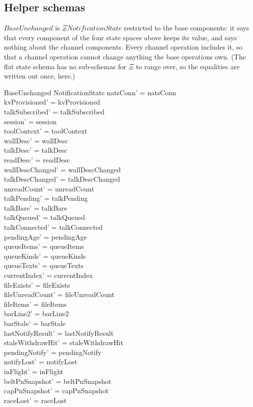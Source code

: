 \documentclass[a4paper,10pt,fleqn]{article}
\begin{document}
\subsection{Helper schemas}
\label{sec:chanhelpers}

$BaseUnchanged$ is $\Xi NotificationState$ restricted to the base
components: it says that every component of the four state spaces above
keeps its value, and says nothing about the channel components.  Every
channel operation includes it, so that a channel operation cannot change
anything the base operations own.  (The flat state schema has no sub-schemas
for $\Xi$ to range over, so the equalities are written out once, here.)

\begin{schema}{BaseUnchanged}
  \Delta NotificationState
  \where
  natsConn' = natsConn \\
  kvProvisioned' = kvProvisioned \\
  talkSubscribed' = talkSubscribed \\
  session' = session \\
  toolContext' = toolContext \\
  wallDesc' = wallDesc \\
  talkDesc' = talkDesc \\
  readDesc' = readDesc \\
  wallDescChanged' = wallDescChanged \\
  talkDescChanged' = talkDescChanged \\
  unreadCount' = unreadCount \\
  talkPending' = talkPending \\
  talkBare' = talkBare \\
  talkQueued' = talkQueued \\
  talkConnected' = talkConnected \\
  pendingAge' = pendingAge \\
  queueItems' = queueItems \\
  queueKinds' = queueKinds \\
  queueTexts' = queueTexts \\
  currentIndex' = currentIndex \\
  fileExists' = fileExists \\
  fileUnreadCount' = fileUnreadCount \\
  fileItems' = fileItems \\
  barLine2' = barLine2 \\
  barStale' = barStale \\
  lastNotifyResult' = lastNotifyResult \\
  staleWithdrawHit' = staleWithdrawHit \\
  pendingNotify' = pendingNotify \\
  notifyLost' = notifyLost \\
  inFlight' = inFlight \\
  beltPnSnapshot' = beltPnSnapshot \\
  capPnSnapshot' = capPnSnapshot \\
  raceLost' = raceLost
\end{schema}
\end{document}
